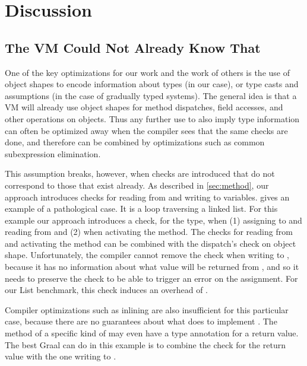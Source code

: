 
\section{Discussion}
\label{sec:discussion}

\subsection{The VM Could Not Already Know That}
\label{sec:disc-pathological-case}



One of the key optimizations for our work
and the work of others\citep{Bauman2017,Richards2017}
is the use of object shapes
to encode information about types
(in our case),
or type casts and assumptions
(in the case of gradually typed systems).
%
The general idea is that a VM will already use object shapes
for method dispatches, field accesses, and other operations on objects.
Thus any further use to also imply type information
can often be optimized away
when the compiler sees that the same checks are done,
and therefore can be combined
by optimizations such as common subexpression elimination.

This assumption breaks, however, when checks are introduced
that do not correspond to those that exist already.
As described in \cref{sec:method},
our approach introduces checks for reading from and writing to variables.
 gives an example of a pathological case.
It is a loop traversing a linked list.
For this example our approach 
introduces a check, for the  type,
when (1) assigning to and reading from  and
(2) when activating the  method.
The checks for reading from  and activating the method can be
combined with the dispatch's check on object shape.
%
Unfortunately, the compiler cannot remove the check
when writing to , because it has no information about
what value will be returned from , and so it needs to preserve the check to be able to trigger an error
on the assignment.
For our List benchmark, this check induces an overhead of \OverheadListP.

Compiler optimizations such as inlining are also insufficient
for this particular case, because there are no guarantees about what
 does to implement .
The  method of a specific kind of  may even have
a type annotation for a return value.
The best Graal can do in this example is to combine the check for the
return value with the one writing to .

